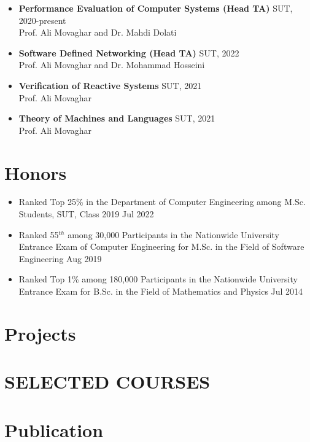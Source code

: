 \documentclass[11pt]{article}
\begin{document}
\begin{itemize}

	\item \textbf{Performance Evaluation of Computer Systems (Head TA)} \hfill SUT, 2020-present
		\\ Prof. Ali Movaghar and Dr. Mahdi Dolati
	\item \textbf{Software Defined Networking (Head TA)} \hfill SUT, 2022
		\\ Prof. Ali Movaghar and Dr. Mohammad Hosseini
	\item \textbf{Verification of Reactive Systems} \hfill SUT, 2021
		\\ Prof. Ali Movaghar 
	\item \textbf{Theory of Machines and Languages} \hfill SUT, 2021
		\\ Prof. Ali Movaghar 

		
\end{itemize}

\section{Honors}
\begin{itemize}
	\renewcommand\labelitemi{\ding{118}}
	\item{Ranked Top 25\% in the Department of Computer Engineering among M.Sc. Students, SUT, Class 2019 \hfill Jul 2022}\vspace{-2mm}
	\item {Ranked 55$^{th}$ among 30,000 Participants in the Nationwide University Entrance Exam of Computer Engineering for M.Sc. in the Field of Software Engineering \hfill Aug 2019}\vspace{-2mm}
	\item{Ranked Top 1\% among 180,000 Participants in the Nationwide University Entrance Exam for B.Sc. in the Field of Mathematics and Physics  \hfill Jul 2014}
\end{itemize}


\section{Projects}
\section{SELECTED COURSES}



\section {Publication}
\end{document}
